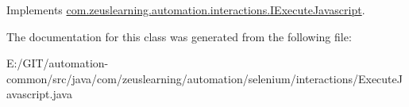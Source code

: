 Implements \hyperlink{interfacecom_1_1zeuslearning_1_1automation_1_1interactions_1_1IExecuteJavascript_a2460e236de6afd1c685b77700474b901}{com.\+zeuslearning.\+automation.\+interactions.\+I\+Execute\+Javascript}.



The documentation for this class was generated from the following file\+:\begin{DoxyCompactItemize}
\item 
E\+:/\+G\+I\+T/automation-\/common/src/java/com/zeuslearning/automation/selenium/interactions/Execute\+Javascript.\+java\end{DoxyCompactItemize}

